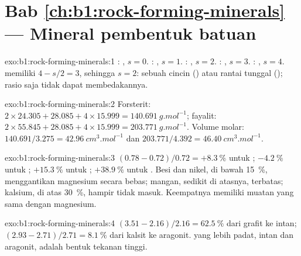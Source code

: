 \section*{Bab \ref{ch:b1:rock-forming-minerals} --- Mineral pembentuk batuan}

\begin{solution}{exo:b1:rock-forming-minerals:1}
: , $s = 0$. : ,
$s = 1$. : , $s = 2$. :
, $s = 3$. : , $s = 4$. 
memiliki $4 - s/2 = 3$, sehingga $s = 2$: sebuah cincin () atau rantai tunggal
(); rasio saja tidak dapat membedakannya.
\end{solution}

\begin{solution}{exo:b1:rock-forming-minerals:2}
Forsterit: $2\times24.305 + 28.085 + 4\times15.999 =
\qty{140.691}{g.mol^{-1}}$; fayalit: $2\times55.845 + 28.085 +
4\times15.999 = \qty{203.771}{g.mol^{-1}}$. Volume molar:
$140.691/3.275 = \qty{42.96}{cm^3.mol^{-1}}$ dan $203.771/4.392 =
\qty{46.40}{cm^3.mol^{-1}}$.
\end{solution}

\begin{solution}{exo:b1:rock-forming-minerals:3}
$(0.78 - 0.72)/0.72 = +\qty{8.3}{\percent}$ untuk ;
$-\qty{4.2}{\percent}$ untuk ; $+\qty{15.3}{\percent}$ untuk
; $+\qty{38.9}{\percent}$ untuk . Besi dan nikel, di bawah \qty{15}{\percent}, menggantikan magnesium secara bebas; mangan, sedikit di atasnya, terbatas; kalsium, di atas \qty{30}{\percent}, hampir tidak masuk. Keempatnya memiliki muatan yang sama dengan magnesium.
\end{solution}

\begin{solution}{exo:b1:rock-forming-minerals:4}
$(3.51 - 2.16)/2.16 = \qty{62.5}{\percent}$ dari grafit ke intan;
$(2.93 - 2.71)/2.71 = \qty{8.1}{\percent}$ dari kalsit ke aragonit.  yang lebih padat, intan dan aragonit, adalah bentuk tekanan tinggi.
\end{solution}

